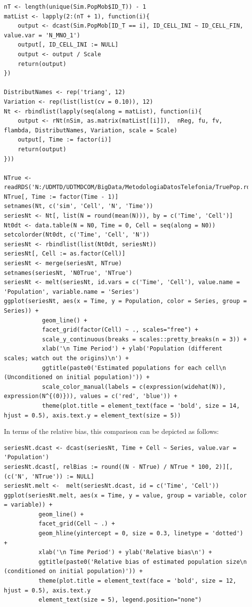 \documentclass[12pt, a4paper]{article}
\begin{document}
\begin{verbatim}
nT <- length(unique(Sim.PopMob$ID_T)) - 1
matList <- lapply(2:(nT + 1), function(i){
    output <- dcast(Sim.PopMob[ID_T == i], ID_CELL_INI ~ ID_CELL_FIN, value.var = 'N_MNO_1')
    output[, ID_CELL_INI := NULL]
    output <- output / Scale
    return(output)
})

DistributNames <- rep('triang', 12)
Variation <- rep(list(list(cv = 0.10)), 12)
Nt <- rbindlist(lapply(seq(along = matList), function(i){
    output <- rNt(nSim, as.matrix(matList[[i]]),  nReg, fu, fv, flambda, DistributNames, Variation, scale = Scale)
    output[, Time := factor(i)]
    return(output)
}))

NTrue <- readRDS('N:/UDMTD/UDTMDCOM/BigData/MetodologiaDatosTelefonia/TruePop.rds')
NTrue[, Time := factor(Time - 1)]
setnames(Nt, c('sim', 'Cell', 'N', 'Time'))
seriesNt <- Nt[, list(N = round(mean(N))), by = c('Time', 'Cell')]
Nt0dt <- data.table(N = N0, Time = 0, Cell = seq(along = N0))
setcolorder(Nt0dt, c('Time', 'Cell', 'N'))
seriesNt <- rbindlist(list(Nt0dt, seriesNt))
seriesNt[, Cell := as.factor(Cell)]
seriesNt <- merge(seriesNt, NTrue)
setnames(seriesNt, 'N0True', 'NTrue')
seriesNt <- melt(seriesNt, id.vars = c('Time', 'Cell'), value.name = 'Population', variable.name = 'Series')
ggplot(seriesNt, aes(x = Time, y = Population, color = Series, group = Series)) + 
           geom_line() + 
           facet_grid(factor(Cell) ~ ., scales="free") +
           scale_y_continuous(breaks = scales::pretty_breaks(n = 3)) +
           xlab('\n Time Period') + ylab('Population (different scales; watch out the origins)\n') +
           ggtitle(paste0('Estimated populations for each cell\n (Unconditioned on initial population)')) +
           scale_color_manual(labels = c(expression(widehat(N)), expression(N^{(0)})), values = c('red', 'blue')) +
           theme(plot.title = element_text(face = 'bold', size = 14, hjust = 0.5), axis.text.y = element_text(size = 5))
\end{verbatim}


In terms of the relative bias, this comparison can be depicted as follows:
\begin{verbatim}
seriesNt.dcast <- dcast(seriesNt, Time + Cell ~ Series, value.var = 'Population')
seriesNt.dcast[, relBias := round((N - NTrue) / NTrue * 100, 2)][, (c('N', 'NTrue')) := NULL]
seriesNt.melt <-  melt(seriesNt.dcast, id = c('Time', 'Cell'))
ggplot(seriesNt.melt, aes(x = Time, y = value, group = variable, color = variable)) + 
          geom_line() + 
          facet_grid(Cell ~ .) +
          geom_hline(yintercept = 0, size = 0.3, linetype = 'dotted') + 
          xlab('\n Time Period') + ylab('Relative bias\n') +
          ggtitle(paste0('Relative bias of estimated population size\n (conditioned on initial population)')) +
          theme(plot.title = element_text(face = 'bold', size = 12, hjust = 0.5), axis.text.y 
          element_text(size = 5), legend.position="none")
\end{verbatim}
\end{document}
